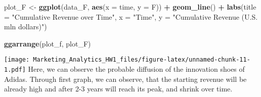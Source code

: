 \documentclass[
]{article}
\newenvironment{Shaded}{\begin{snugshade}}{\end{snugshade}}
\newcommand{\AttributeTok}[1]{\textcolor[rgb]{0.13,0.29,0.53}{#1}}
\newcommand{\FunctionTok}[1]{\textcolor[rgb]{0.13,0.29,0.53}{\textbf{#1}}}
\newcommand{\NormalTok}[1]{#1}
\newcommand{\OtherTok}[1]{\textcolor[rgb]{0.56,0.35,0.01}{#1}}
\newcommand{\SpecialCharTok}[1]{\textcolor[rgb]{0.81,0.36,0.00}{\textbf{#1}}}
\newcommand{\StringTok}[1]{\textcolor[rgb]{0.31,0.60,0.02}{#1}}
\begin{document}
\begin{Shaded}
\begin{Highlighting}[]
\NormalTok{plot\_F }\OtherTok{\textless{}{-}} \FunctionTok{ggplot}\NormalTok{(data\_F, }\FunctionTok{aes}\NormalTok{(}\AttributeTok{x =}\NormalTok{ time, }\AttributeTok{y =}\NormalTok{ F)) }\SpecialCharTok{+}
  \FunctionTok{geom\_line}\NormalTok{() }\SpecialCharTok{+}
  \FunctionTok{labs}\NormalTok{(}\AttributeTok{title =} \StringTok{"Cumulative Revenue   over Time"}\NormalTok{, }\AttributeTok{x =} \StringTok{"Time"}\NormalTok{, }\AttributeTok{y =} \StringTok{"Cumulative Revenue (U.S. mln dollars)"}\NormalTok{)}

\FunctionTok{ggarrange}\NormalTok{(plot\_f, plot\_F)}
\end{Highlighting}
\end{Shaded}

\texttt{[image: Marketing\_Analytics\_HW1\_files/figure-latex/unnamed-chunk-11-1.pdf]}
Here, we can observe the probable diffusion of the innovation shoes of
Adidas. Through first graph, we can observe, that the starting revenue
will be already high and after 2-3 years will reach its peak, and shrink
over time.
\end{document}
